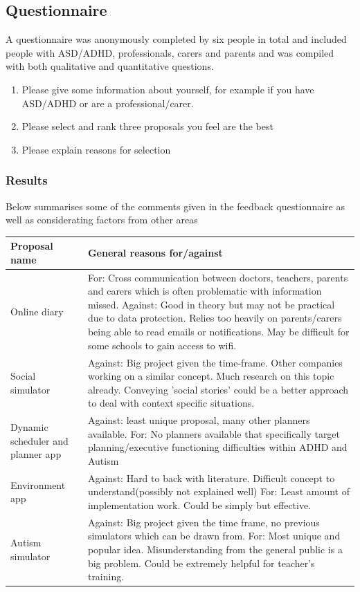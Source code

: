 \documentclass[11pt]{report}
\begin{document}
\subsection{Questionnaire}
A questionnaire was anonymously completed by six people in total and included people with ASD/ADHD, professionals, carers and parents and was compiled with both qualitative and quantitative questions.

\begin{enumerate}
\item Please give some information about yourself, for example if you have ASD/ADHD or are a professional/carer.
\item Please select and rank three proposals you feel are the best
\item Please explain reasons for selection
\end{enumerate}

\subsubsection{Results}

Below summarises some of the comments given in the feedback questionnaire as well as considerating factors from other areas

\begin{table}[H]
    \begin{tabular}{| p{4cm} | p{8cm} |}
    \hline
    Proposal name & General reasons for/against                                                                 \\
    \hline
    \hline
    Online diary & For: Cross communication between doctors, teachers, parents and carers which is often problematic with information missed. Against: Good in theory but may not be practical due to data protection. Relies too heavily on parents/carers being able to read emails or notifications. May be difficult for some schools to gain access to wifi.                \\
    \hline
    Social simulator & Against: Big project given the time-frame. Other companies working on a similar concept. Much research on this topic already. Conveying 'social stories' could be a better approach to deal with context specific situations. \\
    \hline
    Dynamic scheduler and planner app & Against: least unique proposal, many other planners available. For: No planners available that specifically target planning/executive functioning difficulties within ADHD and Autism \\
    \hline
    Environment app & Against: Hard to back with literature. Difficult concept to understand(possibly not explained well) For: Least amount of implementation work. Could be simply but effective. \\
    \hline
   Autism simulator & Against: Big project given the time frame, no previous simulators which can be drawn from. For: Most unique and popular idea. Misunderstanding from the general public is a big problem. Could be extremely helpful for teacher's training. \\
    \hline
    \end{tabular}
\end{table}
\end{document}
